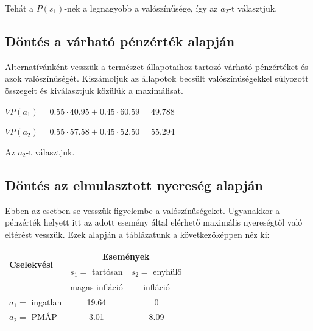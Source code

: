 \documentclass[a4paper,12pt]{article}
\begin{document}
Tehát a $P(s_1)$-nek a legnagyobb a valószínűsége, így az $a_2$-t választjuk.

\subsection{Döntés a várható pénzérték alapján}
\label{VP}
Alternatívánként vesszük a természet állapotaihoz tartozó várható pénzértéket és azok valószínűségét. Kiszámoljuk az állapotok becsült valószínűségekkel súlyozott összegeit és kiválasztjuk közülük a maximálisat.

$VP(a_1) = 0.55\cdot 40.95 + 0.45\cdot 60.59 = 49.788$

$VP(a_2) = 0.55\cdot 57.58 + 0.45\cdot 52.50 = 55.294$

Az $a_2$-t választjuk.


\subsection{Döntés az elmulasztott nyereség alapján}
\label{susec:elmunyer}
Ebben az esetben se vesszük figyelembe a valószínűségeket. Ugyanakkor a pénzérték helyett itt az adott esemény által elérhető maximális nyereségtől való eltérést vesszük. Ezek alapján a táblázatunk a következőképpen néz ki:


\begin{center}
\begin{tabular}{l|c|c}
\multirow{2}{*}{\bf Cselekvési} &  \multicolumn{2}{c}{ \bf Események }\\
 {\bf lehetőségek} & $s_1=$ tartósan & $s_2=$ enyhülő \\
  & magas infláció &  infláció \\
\hline
  $a_1=$ ingatlan & 19.64 & 0 \\
  $a_2=$ PMÁP & 3.01 & 8.09 \\
\end{tabular}
\end{center}
\end{document}
